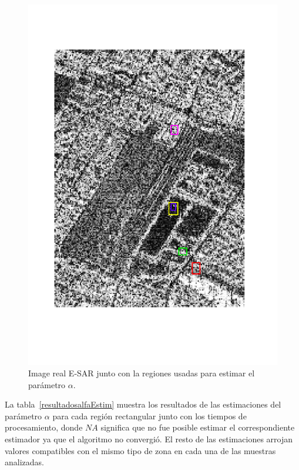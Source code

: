 \begin{figure}[h!]
	\centering
	\includegraphics[width=.52\linewidth,angle=-90]{../../Figures/Tesis/Capitulo6/MunchCortadaReg.pdf}
	\caption{\label{reales2}Image real E-SAR junto con la regiones usadas para estimar el parámetro $\alpha$.}
\end{figure}

La tabla~\ref{resultadosalfaEstim} muestra los resultados de las estimaciones del parámetro $\alpha$ para cada región rectangular junto con los tiempos de procesamiento, donde $NA$ significa que no fue posible estimar el correspondiente estimador ya que el algoritmo no convergió. El resto de las estimaciones arrojan valores compatibles con el mismo tipo de zona en cada una de las muestras analizadas.

